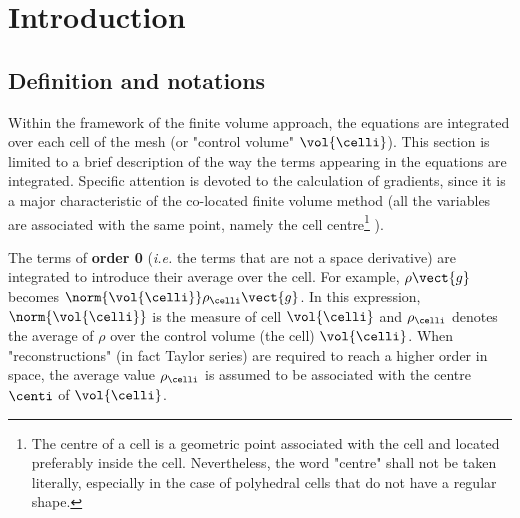 
%
%
%
%


\section{Introduction}

\subsection{Definition and notations}

Within the framework of the finite volume approach, the equations are
integrated over each cell of the mesh (or "control volume" $\vol{\celli}$). 
This section is limited to a brief description of the way the terms appearing in
the equations are integrated. Specific attention is devoted to the
calculation of gradients, since it is a major characteristic of the
co-located finite volume method (all the variables are associated with the
same point, namely the cell centre\footnote{%
The centre of a cell is a geometric point associated with the cell and
located preferably inside the cell. Nevertheless, the word "centre" shall
not be taken literally,
especially in the case of polyhedral cells that do not have a regular shape.}%
).

The terms of \textbf{order 0} (\emph{i.e.} the terms that are not a space
derivative) are integrated to introduce their average over the cell. For
example, $\rho \vect{g}$ becomes $\norm{\vol{\celli}} \rho_{\celli} \vect{g}$. 
In this expression, $\norm{\vol{\celli}}$ is the measure of cell $\vol{\celli}$ and 
$\rho_{\celli}$ denotes the average of $\rho $ over the control volume
(the cell) $\vol{\celli}$. When
"reconstructions" (in fact Taylor series) are required to reach a higher
order in space, the average value $\rho_{\celli}$ is assumed to be associated
with the centre $\centi$ of $\vol{\celli}$.

